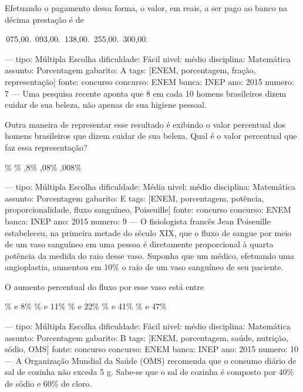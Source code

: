 Efetuando o pagamento dessa forma, o valor, em reais, a ser pago ao banco na décima prestação é de
\begin{choices}
\,075,00.
\,093,00.
\,138,00.
\,255,00.
\,300,00.
\end{choices}

---
tipo: Múltipla Escolha
dificuldade: Fácil
nivel: médio
disciplina: Matemática
assunto: Porcentagem
gabarito: A
tags: [ENEM, porcentagem, fração, representação]
fonte: concurso
concurso: ENEM
banca: INEP
ano: 2015
numero: 7
---
\question
Uma pesquisa recente aponta que 8 em cada 10 homens brasileiros dizem cuidar de sua beleza, não apenas de sua higiene pessoal.

Outra maneira de representar esse resultado é exibindo o valor percentual dos homens brasileiros que dizem cuidar de sua beleza. Qual é o valor percentual que faz essa representação?
\begin{choices}
\%
\%
,8\%
,08\%
,008\%
\end{choices}

---
tipo: Múltipla Escolha
dificuldade: Média
nivel: médio
disciplina: Matemática
assunto: Porcentagem
gabarito: E
tags: [ENEM, porcentagem, potência, proporcionalidade, fluxo sanguíneo, Poiseuille]
fonte: concurso
concurso: ENEM
banca: INEP
ano: 2015
numero: 9
---
\question
O fisiologista francês Jean Poiseuille estabeleceu, na primeira metade do século XIX, que o fluxo de sangue por meio de um vaso sanguíneo em uma pessoa é diretamente proporcional à quarta potência da medida do raio desse vaso. Suponha que um médico, efetuando uma angioplastia, aumentou em 10\% o raio de um vaso sanguíneo de seu paciente.

O aumento percentual do fluxo por esse vaso está entre
\begin{choices}
\% e 8\%
\% e 11\%
\% e 22\%
\% e 41\%
\% e 47\%
\end{choices}

---
tipo: Múltipla Escolha
dificuldade: Fácil
nivel: médio
disciplina: Matemática
assunto: Porcentagem
gabarito: B
tags: [ENEM, porcentagem, saúde, nutrição, sódio, OMS]
fonte: concurso
concurso: ENEM
banca: INEP
ano: 2015
numero: 10
---
\question
A Organização Mundial da Saúde (OMS) recomenda que o consumo diário de sal de cozinha não exceda 5 g. Sabe-se que o sal de cozinha é composto por 40\% de sódio e 60\% de cloro.

